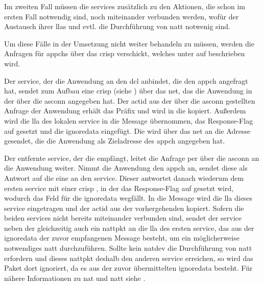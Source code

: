 Im zweiten Fall müssen die \glspl{service} zusätzlich zu den Aktionen, die
schon im ersten Fall notwendig sind, noch miteinander verbunden werden, wofür
der Austausch ihrer \glspl{lla} und evtl. die Durchführung von \gls{natt}
notwenig sind.

Um diese Fälle in der Umsetzung nicht weiter behandeln zu müssen, werden die
Anfragen für \glspl{appch} über das \acrfull{crisp} verschickt, welches unter
 auf  beschrieben wird.

Der \gls{service}, der die Anwendung an den \gls{dcl} anbindet, die den
\gls{appch} angefragt hat, sendet zum Aufbau eine \acrshort{crisp}
\msg{\crispneighreq} (siehe ) über das
\gls{net}, das die Anwendung in der \msg{\asprotoappchoutreq} über die
\gls{asconn} angegeben hat.
Der \gls{actid} aus der über die \gls{asconn} gestellten Anfrage der Anwendung
erhält das Präfix  und wird in die
\msg{\crispneighreq} kopiert.
Außerdem wird die \gls{lla} des lokalen \gls{service} in die Message übernommen,
das Response-Flag auf  gesetzt und die \gls{ignoredata} eingefügt.
Die \msg{\crispneighreq} wird über das \gls{net} an die Adresse gesendet, die
die Anwendung als Zieladresse des \gls{appch} angegeben hat.

Der entfernte \gls{service}, der die \msg{\crispneighreq} empfängt, leitet die
Anfrage per \msg{\asprotoappchinreq} über die \gls{asconn} an die Anwendung
weiter.
Nimmt die Anwendung den \gls{appch} an, sendet diese als Antwort auf die
\msg{\asprotoappchinreq} eine \msg{\asprotoappchaccept} an den \gls{service}.
Dieser antwortet danach wiederum dem ersten \gls{service} mit einer
\acrshort{crisp} \msg{\crispneighreq}, in der das Response-Flag auf 
gesetzt wird, wodurch das Feld für die \gls{ignoredata} wegfällt.
In die Message wird die \gls{lla} dieses \gls{service} eingetragen und der
\gls{actid} aus der vorhergehenden \msg{\crispneighreq} kopiert.
Sofern die beiden \glspl{service} nicht bereits miteinander verbunden sind,
sendet der \gls{service} neben der \msg{\crispneighreq} gleichzeitig auch ein
\gls{nattpkt} an die \gls{lla} des ersten \gls{service}, das aus der
\gls{ignoredata} der zuvor empfangenen Message besteht, um ein möglicherweise
notwendiges \gls{natt} durchzuführen.
Sollte kein \gls{natdev} die Durchführung von \gls{natt} erfordern und dieses
\gls{nattpkt} deshalb den anderen \gls{service} erreichen, so wird das Paket
dort ignoriert, da es aus der zuvor übermittelten \gls{ignoredata} besteht.
Für nähere Informationen zu \gls{nat} und \gls{natt} siehe .

